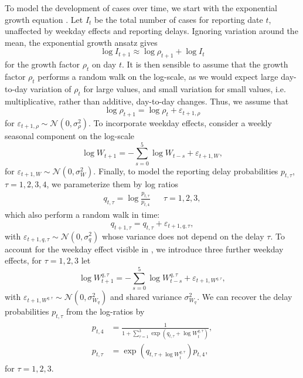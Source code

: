 To model the development of cases over time, we start with the exponential growth equation . Let $I_{t}$ be the total number of cases for reporting date $t$, unaffected by weekday effects and reporting delays. Ignoring variation around the mean, the exponential growth ansatz gives 
$$
    \log I_{t + 1} \approx \log \rho_{t + 1}  + \log I_{t}
$$
for the growth factor $\rho_{t}$ on day $t$. It is then sensible to assume that the growth factor $\rho_{t}$ performs a random walk on the log-scale, as we would expect large day-to-day variation of $\rho_{t}$ for large values, and small variation for small values, i.e. multiplicative, rather than additive, day-to-day changes. Thus, we assume that 
$$
    \log \rho_{t + 1} = \log \rho_{t} + \varepsilon_{t + 1, \rho}
$$
for $\varepsilon_{t + 1,\rho} \sim \mathcal N(0, \sigma^{2}_\rho)$. To incorporate weekday effects, consider a weekly seasonal component on the log-scale 
$$
    \log W_{t + 1} = - \sum_{s = 0}^{5} \log W_{t - s} + \varepsilon_{t + 1, W},
$$
for $\varepsilon_{t + 1, W} \sim \mathcal N(0, \sigma^{2}_{W})$. Finally, to model the reporting delay probabilities $p_{t,\tau}$, $\tau = 1,2,3,4$, we parameterize them by log ratios
\begin{align*}
    q_{t, \tau} = \log \frac{p_{t,\tau}}{p_{t,4}} && \tau = 1, 2, 3,
\end{align*}
which also perform a random walk in time: 
$$
    q_{t + 1, \tau} = q_{t, \tau} + \varepsilon_{t+1, q, \tau},
$$
with $\varepsilon_{t + 1, q, \tau} \sim \mathcal N(0, \sigma^{2}_{q})$ whose variance does not depend on the delay $\tau$. To account for the weekday effect visible in , we introduce three further weekday effects, for $\tau = 1,  2, 3$ let
$$
    \log W^{q,\tau}_{t + 1} = - \sum_{s = 0}^{5} \log W^{q,\tau}_{t - s} + \varepsilon_{t + 1, W^{q,\tau}},
$$
with $\varepsilon_{t+1, W^{q,\tau}} \sim \mathcal N \left( 0, \sigma^{2}_{W_q} \right)$ and shared variance $\sigma^{2}_{W_{q}}$.
We can recover the delay probabilities $p_{t, \tau}$ from the log-ratios by 
\begin{align}
    \begin{split}
        \label{eq:p-from-log-ratios}
    p_{t, 4} &= \frac{1}{1 + \sum_{\tau = 1}^3 \exp \left( q_{t,\tau} + \log W^{q,\tau}_{t} \right)}, \\
    p_{t, \tau} &= \exp\left( q_{t, \tau + \log W^{q, \tau}_{t}} \right) p_{t, 4},
    \end{split}
\end{align}
for $\tau = 1, 2, 3$.

